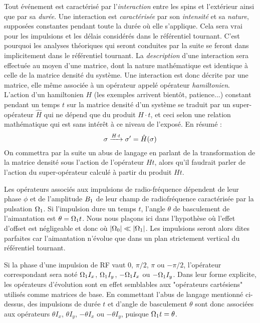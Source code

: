 Tout événement est caractérisé par l'\emph{interaction} entre les spins et l'extérieur
ainsi que par sa \emph{durée}.
Une interaction est \emph{caractérisée} par son \emph{intensité} et sa \emph{nature},
supposées constantes pendant toute la durée où elle s'applique. 
Cela sera vrai pour les impulsions et les délais considérés dans le référentiel tournant.
C'est pourquoi les analyses théoriques qui seront conduites par la suite 
se feront dans implicitement dans le référentiel tournant.
La \emph{description} d'une interaction sera effectuée au moyen d'une matrice, 
dont la nature mathématique est identique à celle de la matrice densité du système.
Une interaction est donc décrite par une matrice, elle même associée à un opérateur
appelé opérateur \emph{hamiltonien}.
L'action d'un hamiltonien $H$ (les exemples arrivent bientôt, patience...)
constant pendant un temps $t$ sur la matrice densité 
d'un système se traduit par un super-opérateur $\hat{H}$ qui ne dépend
que du produit $H \cdot t$, et ceci selon une relation mathématique qui
est sans intérêt à ce niveau de l'exposé. 
En résumé :
\begin{equation}
\sigma \xrightarrow{H \cdot t} \sigma' = \hat{H}(\sigma)
\end{equation}
On commettra par la suite un abus de langage en parlant de la transformation
de la matrice densité sous l'action de l'opérateur $Ht$, alors qu'il
faudrait parler de l'action du super-opérateur calculé à partir du produit $Ht$.

Les opérateurs associés aux impulsions de radio-fréquence
dépendent de leur phase $\phi$ et de l'amplitude $B_1$ de leur
champ de radiofréquence caractérisée par la pulsation $\Omega_1$.
Si l'impulsion dure un temps $t$, l'angle $\theta$ de basculement
de l'aimantation est $\theta = \Omega_1 t$.
Nous nous plaçons ici dans l'hypothèse où l'effet d'offset est négligeable
et donc où $|\Omega_0| \ll |\Omega_1|$.
Les impulsions seront alors dites parfaites car l'aimantation
n'évolue que dans un plan strictement vertical du référentiel tournant.

Si la phase d'une impulsion de RF vaut 
0, $\pi/2$, $\pi$ ou $-\pi/2$, l'opérateur correspondant sera noté
$\Omega_1 I_x$, $\Omega_1 I_y$, $-\Omega_1 I_x$ ou $-\Omega_1 I_y$.
Dans leur forme explicite, les opérateurs d'évolution sont en effet 
semblables aux "opérateurs cartésiens" utilisés comme matrices de base. 
En commettant l'abus de langage mentionné ci-dessus, des impulsions de durée $t$
et d'angle de basculement $\theta$ sont donc associées aux opérateurs
$\theta I_x$, $\theta I_y$, $-\theta I_x$ ou $-\theta I_y$,
puisque $\Omega_1 t = \theta$.

